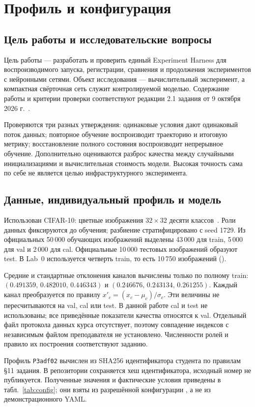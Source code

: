 \section{Профиль и конфигурация}
\subsection{Цель работы и исследовательские вопросы}
Цель работы --- разработать и проверить единый Experiment Harness для воспроизводимого запуска, регистрации, сравнения и продолжения экспериментов с нейронными сетями. Объект исследования --- вычислительный эксперимент, а компактная свёрточная сеть служит контролируемой моделью. Содержание работы и критерии проверки соответствуют редакции 2.1 задания от 9 октября 2026 г.~\cite{lab0}.

Проверяются три разных утверждения: одинаковые условия дают одинаковый поток данных; повторное обучение воспроизводит траекторию и итоговую метрику; восстановление полного состояния воспроизводит непрерывное обучение. Дополнительно оцениваются разброс качества между случайными инициализациями и вычислительная стоимость модели. Высокая точность сама по себе не является целью инфраструктурного эксперимента.

\subsection{Данные, индивидуальный профиль и модель}
Использован CIFAR-10: цветные изображения $32\times32$ десяти классов~\cite{cifar}. Роли данных фиксируются до обучения; разбиение стратифицировано с seed 1729. Из официальных 50\,000 обучающих изображений выделены 43\,000 для train, 5\,000 для val и 2\,000 для cal. Официальные 10\,000 тестовых изображений образуют test. В Lab~0 используется четверть train, то есть 10\,750 изображений ().

Средние и стандартные отклонения каналов вычислены только по полному train: $(0.491359,\,0.482010,\,0.446343)$ и $(0.246676,\,0.243134,\,0.261255)$. Каждый канал преобразуется по правилу $x'_c=(x_c-\mu_c)/\sigma_c$. Эти величины не пересчитываются на val, cal или test. В данной работе cal и test не использованы; все приведённые показатели качества относятся к val. Отдельный файл протокола данных курса отсутствует, поэтому совпадение индексов с независимым файлом преподавателя не установлено. Численности ролей и правило их построения соответствуют заданию.

Профиль \texttt{P3adf02} вычислен из SHA256 идентификатора студента по правилам §11 задания. В репозитории сохраняется хеш идентификатора, исходный номер не публикуется. Полученные значения и фактические условия приведены в табл.~\ref{tab:config}; они взяты из разрешённой конфигурации , а не из демонстрационного YAML.

